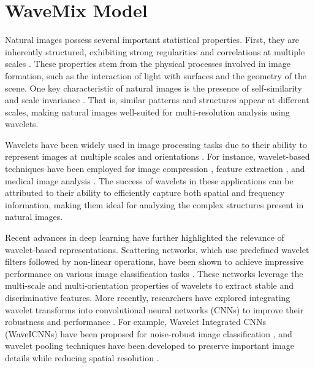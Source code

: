 
\section{WaveMix Model}

Natural images possess several important statistical properties. First, they are inherently structured, exhibiting strong regularities and correlations at multiple scales \cite{field1993scale,ruderman1994statistics,lee1996image,parraga2002spatiochromatic,zoran2009scale}. These properties stem from the physical processes involved in image formation, such as the interaction of light with surfaces and the geometry of the scene. One key characteristic of natural images is the presence of self-similarity and scale invariance \cite{field1993scale,zoran2009scale}. That is, similar patterns and structures appear at different scales, making natural images well-suited for multi-resolution analysis using wavelets.

Wavelets have been widely used in image processing tasks due to their ability to represent images at multiple scales and orientations \cite{ruikar2010image,guo2017deep,mahmood2018facial}. For instance, wavelet-based techniques have been employed for image compression \cite{lewis1992image}, feature extraction \cite{mowlaei2002feature}, and medical image analysis \cite{ranaware2016detection,nayak2016brain}. The success of wavelets in these applications can be attributed to their ability to efficiently capture both spatial and frequency information, making them ideal for analyzing the complex structures present in natural images.

Recent advances in deep learning have further highlighted the relevance of wavelet-based representations. Scattering networks, which use predefined wavelet filters followed by non-linear operations, have been shown to achieve impressive performance on various image classification tasks \cite{bruna2013invariant}. These networks leverage the multi-scale and multi-orientation properties of wavelets to extract stable and discriminative features. More recently, researchers have explored integrating wavelet transforms into convolutional neural networks (CNNs) to improve their robustness and performance \cite{li2020wavelet,liu2018multi,kumar2017cnn,williams2018wavelet}. For example, Wavelet Integrated CNNs (WaveICNNs) have been proposed for noise-robust image classification \cite{li2020wavelet}, and wavelet pooling techniques have been developed to preserve important image details while reducing spatial resolution \cite{williams2018wavelet}.

